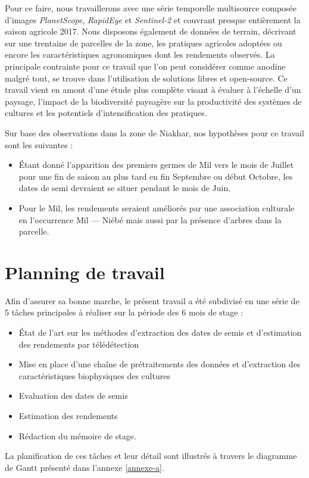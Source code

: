 \vspace{5mm} %

Pour ce faire, nous travaillerons avec une série temporelle multisource composée d'images \emph{PlanetScope}, \emph{RapidEye} et \emph{Sentinel-2} et couvrant presque entièrement 
la saison agricole 2017. Nous disposons également de données de terrain, décrivant sur une trentaine de parcelles de la zone, les pratiques agricoles adoptées ou encore les 
caractéristiques agronomiques dont les rendements observés. La principale contrainte pour ce travail que l'on peut considérer comme anodine malgré tout, se trouve dans l'utilisation 
de solutions libres et open-source. Ce travail vient en amont d'une étude plus complète visant à évaluer à l’échelle d’un paysage, l’impact de la biodiversité paysagère sur la productivité des 
systèmes de cultures et les potentiels d’intensification des pratiques.

\vspace{5mm} %

Sur base des observations dans la zone de Niakhar, nos hypothèses pour ce travail sont les suivantes :
  \begin{itemize}
   \item \'Etant donné l'apparition des premiers germes de Mil vers le mois de Juillet pour une fin de saison au 
   plus tard en fin Septembre ou début Octobre, les dates de semi devraient se situer pendant le mois de Juin. 
   \item Pour le Mil, les rendements seraient améliorés par une association culturale en l'occurrence Mil --- Niébé mais aussi par la présence d'arbres dans la parcelle.
  \end{itemize}

\section{Planning de travail}
Afin d'assurer sa bonne marche, le présent travail a été subdivisé en une série de 5 tâches principales à réaliser sur la période des 6 mois de stage :
  \begin{itemize}
   \item \'Etat de l'art sur les méthodes d'extraction des dates de semis et d'estimation des rendements par télédétection
   \item Mise en place d'une chaîne de prétraitements des données et d'extraction des caractéristiques biophysiques des cultures
   \item Evaluation des dates de semis
   \item Estimation des rendements
   \item Rédaction du mémoire de stage.
  \end{itemize}
La planification de ces tâches et leur détail sont illustrés \`a travers le diagramme de Gantt présenté dans l'annexe \ref{annexe-a}.

